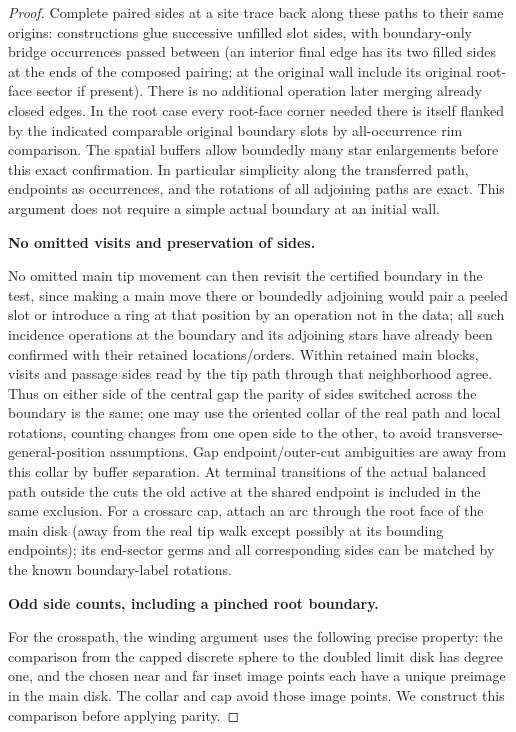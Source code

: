 \begin{proof}
Complete paired sides at a site trace back along these
paths to their same origins: constructions glue successive unfilled slot sides, with
boundary-only bridge occurrences passed between (an interior final edge has its two filled
sides at the ends of the composed pairing; at the original wall include its original
root-face sector if present). There is no additional operation later merging already
closed edges. In the root case every root-face corner needed there is itself flanked by
the indicated comparable original boundary slots by all-occurrence rim comparison. The
spatial buffers allow boundedly many star enlargements before this exact confirmation. In
particular simplicity along the transferred path, endpoints as occurrences, and the
rotations of all adjoining paths are exact. This argument does not require a simple actual
boundary at an initial wall.

\smallskip
\noindent\textbf{No omitted visits and preservation of sides.}\quad

No omitted main tip movement can then revisit the certified boundary in the test, since
making a main move there or boundedly adjoining would pair a peeled slot or introduce a
ring at that position by an operation not in the data; all such incidence operations at
the boundary and its adjoining stars have already been confirmed with their retained
locations/orders. Within retained main blocks, visits and passage sides read by the tip
path through that neighborhood agree. Thus on either side of the central gap the parity of
sides switched across the boundary is the same; one may use the oriented collar of the
real path and local rotations, counting changes from one open side to the other, to avoid
transverse-general-position assumptions. Gap endpoint/outer-cut ambiguities are away from
this collar by buffer separation. At terminal transitions of the actual balanced path
outside the cuts the old active at the shared endpoint is included in the same exclusion.
For a crossarc cap, attach an arc through the root face of the main disk (away from the
real tip walk except possibly at its bounding endpoints); its end-sector germs and all
corresponding sides can be matched by the known boundary-label rotations.

\smallskip
\noindent\textbf{Odd side counts, including a pinched root boundary.}\quad

For the crosspath, the winding argument uses the following precise
property: the comparison from the capped discrete sphere to the doubled
limit disk has degree one, and the chosen near and far inset image points
each have a unique preimage in the main disk. The collar and cap avoid
those image points. We construct this comparison before applying parity.


\end{proof}
